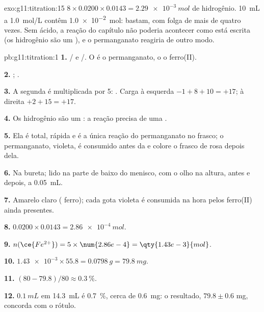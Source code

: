 \begin{solution}{exo:g11:titration:15}
$8 \times 0.0200 \times 0.0143 = \qty{2.29e-3}{mol}$ de  hidrogênio.
\qty{10}{mL} a \qty{1.0}{mol/L} contêm \qty{1.0e-2}{mol}: bastam, com
folga de mais de quatro vezes. Sem ácido, a reação do capítulo não
poderia acontecer como está escrita (os  hidrogênio são um
), e o permanganato reagiria de outro modo.
\end{solution}

\begin{solution}{pb:g11:titration:1}
\textbf{1.} / e /. O
 é o  permanganato, o  o  ferro(II).

\textbf{2.} ;
.

\textbf{3.} A segunda é multiplicada por 5:
. Carga à
esquerda $-1 + 8 + 10 = +17$; à direita $+2 + 15 = +17$.

\textbf{4.} Os  hidrogênio são um : a reação precisa de uma
.

\textbf{5.} Ela é total, rápida e é a única reação do permanganato no
frasco; o permanganato, violeta, é consumido antes da  e
colore o frasco de rosa depois dela.

\textbf{6.} Na bureta; lido na parte de baixo do menisco, com o olho na
altura, antes e depois, a \qty{0.05}{mL}.

\textbf{7.} Amarelo claro ( ferro); cada gota violeta é consumida
na hora pelos  ferro(II) ainda presentes.

\textbf{8.} $0.0200 \times 0.0143 = \qty{2.86e-4}{mol}$.

\textbf{9.} $n(\ce{Fe^{2+}}) = 5 \times \num{2.86e-4} =
\qty{1.43e-3}{mol}$.

\textbf{10.} $\num{1.43e-3} \times 55.8 = \qty{0.0798}{g} =
\qty{79.8}{mg}$.

\textbf{11.} $(80 - 79.8)/80 \approx \qty{0.3}{\percent}$.

\textbf{12.} $\qty{0.1}{mL}$ em \qty{14.3}{mL} é \qty{0.7}{\percent},
cerca de \qty{0.6}{mg}: o resultado, $79.8 \pm 0.6$ mg, concorda com o
rótulo.


\end{solution}

